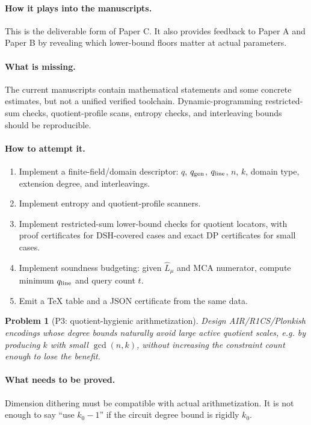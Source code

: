 \documentclass[11pt]{article}
\newtheorem{problem}[theorem]{Problem}
\theoremstyle{definition}
\theoremstyle{remark}
\newcommand{\qgen}{q_{\rm gen}}
\newcommand{\qline}{q_{\rm line}}
\newcommand{\paperA}{Paper A}
\newcommand{\paperB}{Paper B}
\newcommand{\paperC}{Paper C}
\begin{document}
\paragraph{How it plays into the manuscripts.}  This is the deliverable form of \paperC.  It also provides feedback to \paperA{} and \paperB{} by revealing which lower-bound floors matter at actual parameters.

\paragraph{What is missing.}  The current manuscripts contain mathematical statements and some concrete estimates, but not a unified verified toolchain.  Dynamic-programming restricted-sum checks, quotient-profile scans, entropy checks, and interleaving bounds should be reproducible.

\paragraph{How to attempt it.}
\begin{enumerate}[leftmargin=2.2em]
\item Implement a finite-field/domain descriptor: $q$, $\qgen$, $\qline$, $n$, $k$, domain type, extension degree, and interleavings.
\item Implement entropy and quotient-profile scanners.
\item Implement restricted-sum lower-bound checks for quotient locators, with proof certificates for DSH-covered cases and exact DP certificates for small cases.
\item Implement soundness budgeting: given $\widehat L_\mu$ and MCA numerator, compute minimum $\qline$ and query count $t$.
\item Emit a TeX table and a JSON certificate from the same data.
\end{enumerate}

\begin{problem}[P3: quotient-hygienic arithmetization]
\label{prob:P3}
Design AIR/R1CS/Plonkish encodings whose degree bounds naturally avoid large active quotient scales, e.g. by producing $k$ with small $\gcd(n,k)$, without increasing the constraint count enough to lose the benefit.
\end{problem}

\paragraph{What needs to be proved.}  Dimension dithering must be compatible with actual arithmetization.  It is not enough to say ``use $k_0-1$'' if the circuit degree bound is rigidly $k_0$.
\end{document}
